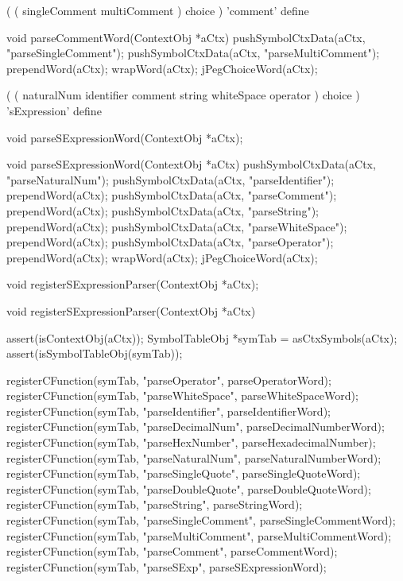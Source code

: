 \starttyping
(
  ( singleComment multiComment ) choice
) 'comment' define
\stoptyping

\startCCode
void parseCommentWord(ContextObj *aCtx) {
  pushSymbolCtxData(aCtx, "parseSingleComment");
  pushSymbolCtxData(aCtx, "parseMultiComment");
  prependWord(aCtx);
  wrapWord(aCtx);
  jPegChoiceWord(aCtx);
}
\stopCCode

\starttyping
(
  (
    naturalNum
    identifier
    comment
    string
    whiteSpace
    operator
  ) choice
) 'sExpression' define
\stoptyping

\startCHeader
void parseSExpressionWord(ContextObj *aCtx);
\stopCHeader

\startCCode
void parseSExpressionWord(ContextObj *aCtx) {
  pushSymbolCtxData(aCtx, "parseNaturalNum");
  pushSymbolCtxData(aCtx, "parseIdentifier");
  prependWord(aCtx);
  pushSymbolCtxData(aCtx, "parseComment");
  prependWord(aCtx);
  pushSymbolCtxData(aCtx, "parseString");
  prependWord(aCtx);
  pushSymbolCtxData(aCtx, "parseWhiteSpace");
  prependWord(aCtx);
  pushSymbolCtxData(aCtx, "parseOperator");
  prependWord(aCtx);
  wrapWord(aCtx);
  jPegChoiceWord(aCtx);
}
\stopCCode

\startCHeader
void registerSExpressionParser(ContextObj *aCtx);
\stopCHeader

\startCCode
void registerSExpressionParser(ContextObj *aCtx) {
  assert(isContextObj(aCtx));
  SymbolTableObj *symTab = asCtxSymbols(aCtx);
  assert(isSymbolTableObj(symTab));
  
  registerCFunction(symTab, "parseOperator",      parseOperatorWord);
  registerCFunction(symTab, "parseWhiteSpace",    parseWhiteSpaceWord);
  registerCFunction(symTab, "parseIdentifier",    parseIdentifierWord);
  registerCFunction(symTab, "parseDecimalNum",    parseDecimalNumberWord);
  registerCFunction(symTab, "parseHexNumber",     parseHexadecimalNumber);
  registerCFunction(symTab, "parseNaturalNum",    parseNaturalNumberWord);
  registerCFunction(symTab, "parseSingleQuote",   parseSingleQuoteWord);
  registerCFunction(symTab, "parseDoubleQuote",   parseDoubleQuoteWord);
  registerCFunction(symTab, "parseString",        parseStringWord);
  registerCFunction(symTab, "parseSingleComment", parseSingleCommentWord);
  registerCFunction(symTab, "parseMultiComment",  parseMultiCommentWord);
  registerCFunction(symTab, "parseComment",       parseCommentWord);
  registerCFunction(symTab, "parseSExp",          parseSExpressionWord);
}
\stopCCode

